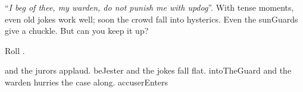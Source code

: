 ``\textit{I beg of thee, my \gls{warden}, do not punish me with updog}''.
With tense moments, even old jokes work well; soon the crowd fall into hysterics.
Even the \glspl{sunGuard} give a chuckle.
But can you keep it up?

Roll .

\begin{selectPath}
  {and the jurors applaud.}%
  {beJester}
  {and the jokes fall flat.}%
  {intoTheGuard}
  {and the \gls{warden} hurries the case along.}%
  {accuserEnters}
\end{selectPath}


